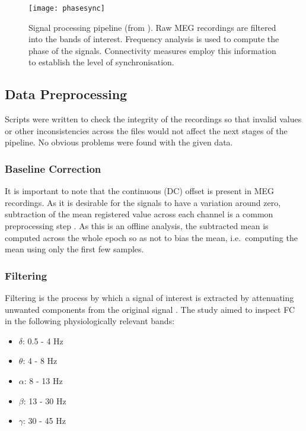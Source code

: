 		\begin{figure}
		    \centering
		    \texttt{[image: phasesync]}
		    \caption{Signal processing pipeline (from \textcite{Varela2001}). Raw \ac{MEG} recordings are filtered into the bands of interest. Frequency analysis is used to compute the phase of the signals. Connectivity measures employ this information to establish the level of synchronisation.}
		    \label{fig:SPpipeline}
		\end{figure}

		\subsection{Data Preprocessing}
		
		Scripts were written to check the integrity of the recordings so that invalid values or other inconsistencies across the files would not affect the next stages of the pipeline. No obvious problems were found with the given data.

				
			\subsubsection{Baseline Correction}
			It is important to note that the continuous (DC) offset is present in \ac{MEG} recordings. As it is desirable for the signals to have a variation around zero, subtraction of the mean registered value across each channel is a common preprocessing step \autocite{Gross2013}. As this is an offline analysis, the subtracted mean is computed across the whole epoch so as not to bias the mean, i.e.\ computing the mean using only the first few samples.

			\subsubsection{Filtering}
			Filtering is the process by which a signal of interest is extracted by attenuating unwanted components from the original signal \autocite{smith1997scientist}. The study aimed to inspect \ac{FC} in the following physiologically relevant bands:
			
			\begin{itemize}
				\itemsep0em
  				\item \(\delta\): 0.5 - 4 Hz  
  				\item \(\theta\): 4 - 8 Hz 	 
  				\item \(\alpha\): 8 - 13 Hz 
  				\item \(\beta\): 13 - 30 Hz 
				\item \(\gamma\): 30 - 45 Hz
			\end{itemize}

